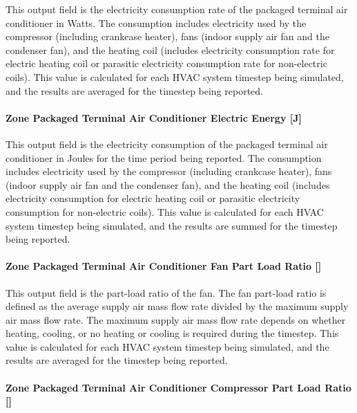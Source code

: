 This output field is the electricity consumption rate of the packaged terminal air conditioner in Watts. The consumption includes electricity used by the compressor (including crankcase heater), fans (indoor supply air fan and the condenser fan), and the heating coil (includes electricity consumption rate for electric heating coil or parasitic electricity consumption rate for non-electric coils). This value is calculated for each HVAC system timestep being simulated, and the results are averaged for the timestep being reported.

\paragraph{Zone Packaged Terminal Air Conditioner Electric Energy {[}J{]}}\label{zone-packaged-terminal-air-conditioner-electric-energy-j}

This output field is the electricity consumption of the packaged terminal air conditioner in Joules for the time period being reported. The consumption includes electricity used by the compressor (including crankcase heater), fans (indoor supply air fan and the condenser fan), and the heating coil (includes electricity consumption for electric heating coil or parasitic electricity consumption for non-electric coils). This value is calculated for each HVAC system timestep being simulated, and the results are summed for the timestep being reported.

\paragraph{Zone Packaged Terminal Air Conditioner Fan Part Load Ratio {[]}}\label{zone-packaged-terminal-air-conditioner-fan-part-load-ratio}

This output field is the part-load ratio of the fan. The fan part-load ratio is defined as the average supply air mass flow rate divided by the maximum supply air mass flow rate. The maximum supply air mass flow rate depends on whether heating, cooling, or no heating or cooling is required during the timestep. This value is calculated for each HVAC system timestep being simulated, and the results are averaged for the timestep being reported.

\paragraph{Zone Packaged Terminal Air Conditioner Compressor Part Load Ratio {[]}}\label{zone-packaged-terminal-air-conditioner-compressor-part-load-ratio}


